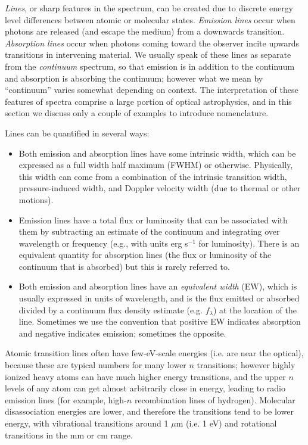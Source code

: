 {\it Lines}, or sharp features in the spectrum, can be created due to
discrete energy level differences between atomic or molecular
states. {\it Emission lines} occur when photons are released (and
escape the medium) from a downwards transition. {\it Absorption lines}
occur when photons coming toward the observer incite upwards
transitions in intervening material. We usually speak of these lines
as separate from the {\it continuum} spectrum, so that emission is in
addition to the continuum and absorption is absorbing the continuum;
however what we mean by ``continuum'' varies somewhat depending on
context.  The interpretation of these features of spectra comprise a
large portion of optical astrophysics, and in this section we discuss
only a couple of examples to introduce nomenclature.

Lines can be quantified in several ways:
\begin{itemize}
\item Both emission and absorption lines have some intrinsic width, which can
be expressed as a full width half maximum (FWHM) or
otherwise. Physically, this width can come from a combination of the
intrinsic transition width, pressure-induced width, and Doppler
velocity width (due to thermal or other motions).
\item Emission lines have a total flux or luminosity that can be associated
with them by subtracting an estimate of the continuum and integrating
over wavelength or frequency (e.g., with units erg s$^{-1}$ for
luminosity). There is an equivalent quantity for absorption lines (the
flux or luminosity of the continuum that is absorbed) but this is
rarely referred to.
\item Both emission and absorption lines  have an {\it equivalent
width} (EW), which is usually expressed in units of wavelength, and is
the flux emitted or absorbed divided by a continuum flux density
estimate (e.g. $f_\lambda$) at the location of the line. Sometimes we
use the convention that positive EW indicates absorption and negative
indicates emission; sometimes the opposite.
\end{itemize}

Atomic transition lines often have few-eV-scale energies (i.e. are
near the optical), because these are typical numbers for many lower
$n$ transitions; however highly ionized heavy atoms can have much
higher energy transitions, and the upper $n$ levels of any atom can
get almost arbitrarily close in energy, leading to radio emission
lines (for example, high-$n$ recombination lines of
hydrogen). Molecular disassociation energies are lower, and therefore
the transitions tend to be lower energy, with vibrational transitions
around 1 $\mu$m (i.e.  1 eV) and rotational transitions in the mm or
cm range.

